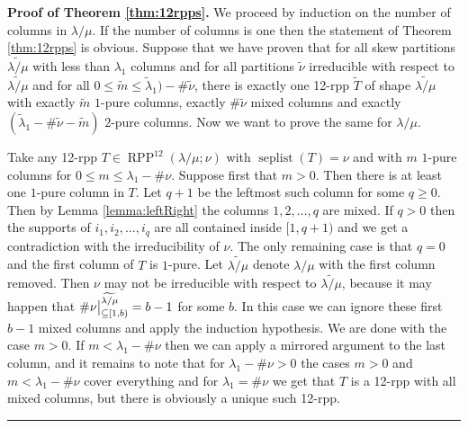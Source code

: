 \documentclass[numbers=enddot,12pt,final,onecolumn,notitlepage]{scrartcl}%
\theoremstyle{definition}
\newenvironment{proof}[1][Proof]{\noindent\textbf{#1.} }{\ \rule{0.5em}{0.5em}}
\def\seplist{{\operatorname*{seplist}}} %
\def\seplistvar{{{\nu}}} %
\def\lm{{\lambda/\mu}}
\def\OneTwoRPPCutvar{{\operatorname*{RPP}^{12}\left(  \lambda/\mu ;\seplistvar \right)}}
\begin{document}
\begin{proof}[Proof of Theorem \ref{thm:12rpps}]
We proceed by induction on the number of columns in $\lm$. If the number of columns is one then the statement of Theorem \ref{thm:12rpps} is obvious. Suppose that we have proven that for all skew partitions $\widetilde{\lm}$ with less than $\lambda_1$ columns and for all partitions $\widetilde\seplistvar$  irreducible with respect to $\widetilde{\lm}$ and for all $0\leq \widetilde m\leq \widetilde{\lambda}_1)-\#\widetilde\seplistvar$, there is exactly one 12-rpp $\widetilde T$ of shape $\widetilde{\lm}$ with exactly $\widetilde m$ $1$-pure columns, exactly $\#\widetilde\seplistvar$ mixed columns and exactly $(\widetilde{\lambda}_1-\#\widetilde\seplistvar-\widetilde m)$ $2$-pure columns. Now we want to prove the same for $\lm$.

Take any 12-rpp $T\in\OneTwoRPPCutvar$ with $\seplist(T)=\seplistvar$ and with $m$ $1$-pure columns for $0\leq m\leq \lambda_1-\#\seplistvar$. Suppose first that $m>0$. Then there is at least one $1$-pure column in $T$. Let $q+1$ be the leftmost such column for some $q\geq 0$. Then by Lemma \ref{lemma:leftRight} the columns $1,2,\dots,q$ are mixed. If $q>0$ then the supports of $i_1,i_2,\dots,i_q$ are all contained inside $[1,q+1)$ and we get a contradiction with the irreducibility of $\seplistvar$. The only remaining case is that $q=0$ and the first column of $T$ is $1$-pure. Let $\widetilde\lm$ denote $\lm$ with the first column removed. Then $\seplistvar$ may not be irreducible with respect to $\widetilde{\lm}$, because it may happen that $\#\nuxy{1}{b}^{\widetilde{\lm}}=b-1$ for some $b$. In this case we can ignore these first $b-1$ mixed columns and apply the induction hypothesis. We are done with the case $m>0$. If $m<\lambda_1-\#\seplistvar$ then we can apply a mirrored argument to the last column, and it remains to note that for $\lambda_1-\#\seplistvar>0$ the cases $m>0$ and $m<\lambda_1-\#\seplistvar$ cover everything and for $\lambda_1=\#\seplistvar$ we get that $T$ is a 12-rpp with all mixed columns, but there is obviously a unique such 12-rpp.
\end{proof}
\end{document}
